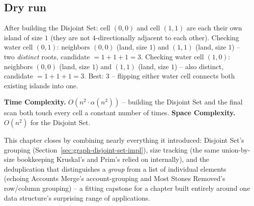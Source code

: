 \subsection*{Dry run}


After building the Disjoint Set: cell $(0,0)$ and cell $(1,1)$ are
each their own island of size $1$ (they are not $4$-directionally
adjacent to each other). Checking water cell $(0,1)$: neighbors
$(0,0)$ (land, size $1$) and $(1,1)$ (land, size $1$) -- two
\emph{distinct} roots, candidate $=1+1+1=3$. Checking water cell
$(1,0)$: neighbors $(0,0)$ (land, size $1$) and $(1,1)$ (land, size
$1$) -- also distinct, candidate $=1+1+1=3$. Best: $3$ -- flipping
either water cell connects both existing islands into one.

\begin{complexitybox}
\textbf{Time Complexity.} $O(n^2 \cdot \alpha(n^2))$ -- building the
Disjoint Set and the final scan both touch every cell a constant
number of times.
\textbf{Space Complexity.} $O(n^2)$ for the Disjoint Set.
\end{complexitybox}

\begin{takeawaybox}
This chapter closes by combining nearly everything it introduced:
Disjoint Set's grouping (Section~\ref{sec:graph-disjoint-set-impl}),
size tracking (the same union-by-size bookkeeping Kruskal's and Prim's
relied on internally), and the deduplication that distinguishes a
\emph{group} from a list of individual elements (echoing Accounts
Merge's account-grouping and Most Stones Removed's row/column
grouping) -- a fitting capstone for a chapter built entirely around one
data structure's surprising range of applications.
\end{takeawaybox}

